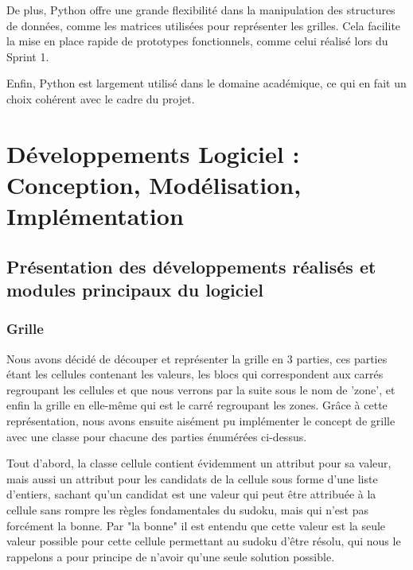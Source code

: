 \documentclass[a4paper]{article}
\begin{document}
De plus, Python offre une grande flexibilité dans la manipulation des structures de données, comme les matrices utilisées pour représenter les grilles. Cela facilite la mise en place rapide de prototypes fonctionnels, comme celui réalisé lors du Sprint 1.

Enfin, Python est largement utilisé dans le domaine académique, ce qui en fait un choix cohérent avec le cadre du projet.

\vspace{0.5cm}

\section{Développements Logiciel : Conception, Modélisation, Implémentation}


\subsection{Présentation des développements réalisés et modules principaux du logiciel}

\subsubsection{Grille}
Nous avons décidé de découper et représenter la grille en 3 parties, ces parties étant les cellules contenant les valeurs, les blocs qui correspondent aux carrés regroupant les cellules et que nous verrons par la suite sous le nom de 'zone', et enfin la grille en elle-même qui est le carré regroupant les zones. Grâce à cette représentation, nous avons ensuite aisément pu implémenter le concept de grille avec une classe pour chacune des parties énumérées ci-dessus.

Tout d’abord, la classe cellule contient évidemment un attribut pour sa valeur, mais aussi un attribut pour les candidats de la cellule sous forme d’une liste d’entiers, sachant qu’un candidat est une valeur qui peut être attribuée à la cellule sans rompre les règles fondamentales du sudoku, mais qui n’est pas forcément la bonne. Par "la bonne" il est entendu que cette valeur est la seule valeur possible pour cette cellule permettant au sudoku d’être résolu, qui nous le rappelons a pour principe de n’avoir qu’une seule solution possible. 
\end{document}
